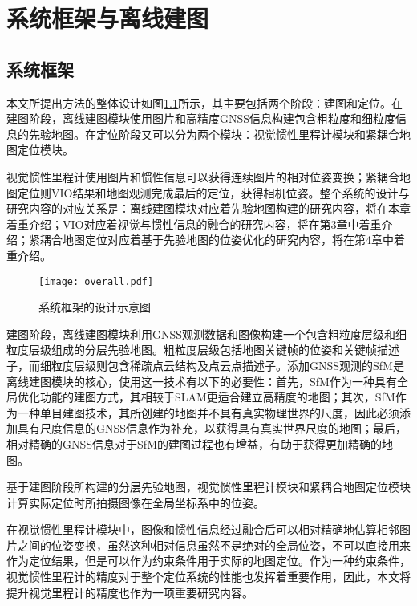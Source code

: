 
\chapter{系统框架与离线建图}

\section{系统框架}

本文所提出方法的整体设计如图\ref{fig:overall}所示，其主要包括两个阶段：建图和定位。在建图阶段，离线建图模块使用图片和高精度GNSS信息构建包含粗粒度和细粒度信息的先验地图。在定位阶段又可以分为两个模块：视觉惯性里程计模块和紧耦合地图定位模块。

视觉惯性里程计使用图片和惯性信息可以获得连续图片的相对位姿变换；紧耦合地图定位则VIO结果和地图观测完成最后的定位，获得相机位姿。整个系统的设计与研究内容的对应关系是：离线建图模块对应着先验地图构建的研究内容，将在本章着重介绍；VIO对应着视觉与惯性信息的融合的研究内容，将在第3章中着重介绍；紧耦合地图定位对应着基于先验地图的位姿优化的研究内容，将在第4章中着重介绍。

\begin{figure}
  \centering
  \texttt{[image: overall.pdf]}
  \caption{系统框架的设计示意图}
  \label{fig:overall}
\end{figure}

建图阶段，离线建图模块利用GNSS观测数据和图像构建一个包含粗粒度层级和细粒度层级组成的分层先验地图。粗粒度层级包括地图关键帧的位姿和关键帧描述子，而细粒度层级则包含稀疏点云结构及点云点描述子。添加GNSS观测的SfM是离线建图模块的核心，使用这一技术有以下的必要性：首先，SfM作为一种具有全局优化功能的建图方式，其相较于SLAM更适合建立高精度的地图；其次，SfM作为一种单目建图技术，其所创建的地图并不具有真实物理世界的尺度，因此必须添加具有尺度信息的GNSS信息作为补充，以获得具有真实世界尺度的地图；最后，相对精确的GNSS信息对于SfM的建图过程也有增益，有助于获得更加精确的地图。

基于建图阶段所构建的分层先验地图，视觉惯性里程计模块和紧耦合地图定位模块计算实际定位时所拍摄图像在全局坐标系中的位姿。

在视觉惯性里程计模块中，图像和惯性信息经过融合后可以相对精确地估算相邻图片之间的位姿变换，虽然这种相对信息虽然不是绝对的全局位姿，不可以直接用来作为定位结果，但是可以作为约束条件用于实际的地图定位。作为一种约束条件，视觉惯性里程计的精度对于整个定位系统的性能也发挥着重要作用，因此，本文将提升视觉里程计的精度也作为一项重要研究内容。


